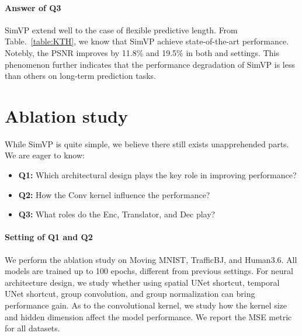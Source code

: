 \documentclass[10pt,twocolumn,letterpaper]{article}
\begin{document}
\vspace{-4mm}
\paragraph{Answer of Q3} SimVP extend well to the case of flexible predictive length. From Table.~\ref{table:KTH}, we know that SimVP achieve state-of-the-art performance. Notebly, the PSNR improves by 11.8\% and 19.5\% in both  and  settings. This phenomenon further indicates that the performance degradation of SimVP is less than others on long-term prediction tasks. 




\vspace{-3mm}

\section{Ablation study}
While SimVP is quite simple, we believe there still exists unapprehended parts. We are eager to know:

\vspace{-2mm}
\begin{itemize}\setlength{\itemsep}{1pt}
  \item \textbf{Q1:} Which architectural design plays the key role in improving performance?
  \setlength{\itemsep}{1pt}
  \setlength{\parsep}{1pt}
  \setlength{\parskip}{1pt}
  
  \item \textbf{Q2:} How the Conv kernel influence the performance? 
  \setlength{\itemsep}{1pt}
  \setlength{\parsep}{1pt}
  \setlength{\parskip}{1pt}
  \item \textbf{Q3:} What roles do the Enc, Translator, and Dec play?
\end{itemize}
 
\vspace{-6mm}
\paragraph{Setting of Q1 and Q2} We perform the ablation study on Moving MNIST, TrafficBJ, and Human3.6. All models are trained up to 100 epochs, different from previous settings. For neural architecture design, we study whether using spatial UNet shortcut, temporal UNet shortcut, group convolution, and group normalization can bring performance gain. As to the convolutional kernel, we study how the kernel size and hidden dimension affect the model performance. We report the MSE metric for all datasets. 
\end{document}
